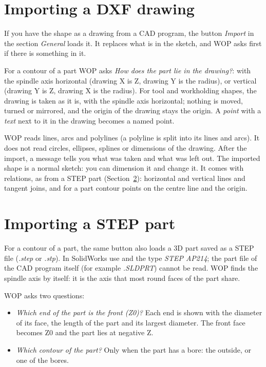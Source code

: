 \section{Importing a DXF drawing}\label{sec:sketch:dxf}

If you have the shape as a drawing from a CAD program, the button \emph{Import} in the section \emph{General} loads it. It replaces what is in the sketch, and WOP asks first if there is something in it.

For a contour of a part WOP asks \emph{How does the part lie in the drawing?}: with the spindle axis horizontal (drawing X is Z, drawing Y is the radius), or vertical (drawing Y is Z, drawing X is the radius). For tool and workholding shapes, the drawing is taken as it is, with the spindle axis horizontal; nothing is moved, turned or mirrored, and the origin of the drawing stays the origin. A \emph{point} with a \emph{text} next to it in the drawing becomes a named point.

WOP reads lines, arcs and polylines (a polyline is split into its lines and arcs). It does not read circles, ellipses, splines or dimensions of the drawing. After the import, a message tells you what was taken and what was left out. The imported shape is a normal sketch: you can dimension it and change it. It comes with relations, as from a STEP part (Section~\ref{sec:sketch:step}): horizontal and vertical lines and tangent joins, and for a part contour points on the centre line and the origin.

\section{Importing a STEP part}\label{sec:sketch:step}

For a contour of a part, the same button also loads a 3D part saved as a STEP file (\emph{.step} or \emph{.stp}). In SolidWorks use  and the type \emph{STEP AP214}; the part file of the CAD program itself (for example \emph{.SLDPRT}) cannot be read. WOP finds the spindle axis by itself: it is the axis that most round faces of the part share.

WOP asks two questions:
\begin{itemize}
\item \emph{Which end of the part is the front (Z0)?} Each end is shown with the diameter of its face, the length of the part and its largest diameter. The front face becomes Z0 and the part lies at negative Z.
\item \emph{Which contour of the part?} Only when the part has a bore: the outside, or one of the bores.
\end{itemize}

